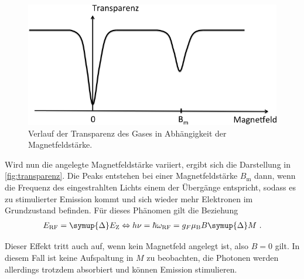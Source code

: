     \begin{figure}
        \centering
        \includegraphics[scale=0.5]{content/img/Abb_2.png}
        \caption{Verlauf der Transparenz des Gases in Abhängigkeit der Magnetfeldstärke. \cite{versuchsanleitung}}
        \label{fig:transparenz}
    \end{figure}

    Wird nun die angelegte Magnetfeldstärke variiert,
    ergibt sich die Darstellung in \autoref{fig:transparenz}.
    Die Peaks entstehen bei einer Magnetfeldstärke $B_\text{m}$ dann,
    wenn die Frequenz des eingestrahlten Lichts einem der Übergänge entspricht,
    sodass es zu stimulierter Emission kommt und sich wieder mehr Elektronen im Grundzustand befinden.
    Für dieses Phänomen gilt die Beziehung
    \begin{align*}
        E_\text{RF} = \symup{\Delta} E_\text{Z}
        \Leftrightarrow
        h \nu = \hbar \omega_\text{RF} = g_F \mu_\text{B} B \symup{\Delta} M
        \ .
    \end{align*}

    Dieser Effekt tritt auch auf,
    wenn kein Magnetfeld angelegt ist,
    also $B = 0$ gilt.
    In diesem Fall ist keine Aufspaltung in $M$ zu beobachten,
    die Photonen werden allerdings trotzdem absorbiert und können Emission stimulieren.
